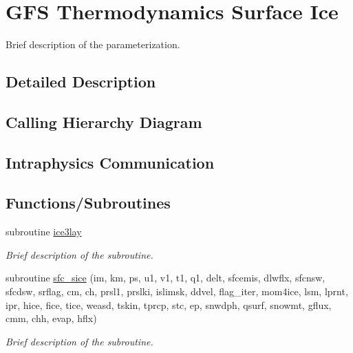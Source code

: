 \hypertarget{group___g_f_s___ice}{}\section{G\+FS Thermodynamics Surface Ice}
\label{group___g_f_s___ice}


Brief description of the parameterization.  




\subsection{Detailed Description}
\hypertarget{group___g_f_s___n_s_s_t_diagram}{}\subsection{Calling Hierarchy Diagram}\label{group___g_f_s___n_s_s_t_diagram}
\hypertarget{group___g_f_s___n_s_s_t_intraphysics}{}\subsection{Intraphysics Communication}\label{group___g_f_s___n_s_s_t_intraphysics}
\subsection*{Functions/\+Subroutines}
\begin{DoxyCompactItemize}
\item 
\mbox{\label{group___g_f_s___ice_ga18fd9a43fb519c32737074cf8f02a496}} 
subroutine \hyperlink{group___g_f_s___ice_ga18fd9a43fb519c32737074cf8f02a496}{ice3lay}
\begin{DoxyCompactList}\small\item\em Brief description of the subroutine. \end{DoxyCompactList}\end{DoxyCompactItemize}
\begin{DoxyCompactItemize}
\item 
subroutine \hyperlink{group___g_f_s___ice_ga9cc05261a34162c47424df528f679ede}{sfc\+\_\+sice} (im, km, ps, u1, v1, t1, q1, delt, sfcemis, dlwflx, sfcnsw, sfcdsw, srflag, cm, ch, prsl1, prslki, islimsk, ddvel, flag\+\_\+iter, mom4ice, lsm, lprnt, ipr, hice, fice, tice, weasd, tskin, tprcp, stc, ep, snwdph, qsurf, snowmt, gflux, cmm, chh, evap, hflx)
\begin{DoxyCompactList}\small\item\em Brief description of the subroutine. \end{DoxyCompactList}\end{DoxyCompactItemize}


